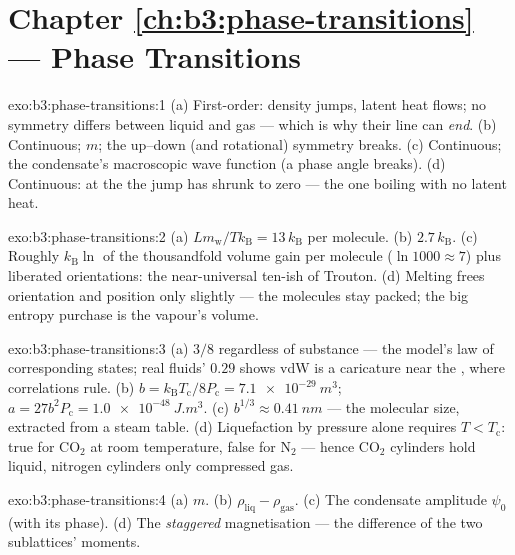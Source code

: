 \section*{Chapter \ref{ch:b3:phase-transitions} --- Phase Transitions}

\begin{solution}{exo:b3:phase-transitions:1}
(a) First-order: density jumps, latent heat flows; no symmetry
differs between liquid and gas --- which is why their line can
\emph{end}. (b) Continuous;  $m$; the up--down (and
rotational) symmetry breaks. (c) Continuous; the condensate's
macroscopic wave function (a phase angle breaks). (d) Continuous:
at the  the jump has shrunk to zero --- the one
boiling with no latent heat.
\end{solution}

\begin{solution}{exo:b3:phase-transitions:2}
(a) $Lm_{\text{w}}/Tk_{\text{B}} = 13\,k_{\text{B}}$ per molecule.
(b) $2.7\,k_{\text{B}}$. (c) Roughly $k_{\text{B}}\ln$ of the
thousandfold volume gain per molecule ($\ln1000 \approx 7$) plus
liberated orientations: the near-universal ten-ish of Trouton. (d)
Melting frees orientation and position only slightly --- the
molecules stay packed; the big entropy purchase is the vapour's
volume.
\end{solution}

\begin{solution}{exo:b3:phase-transitions:3}
(a) $3/8$ regardless of substance --- the model's law of
corresponding states; real fluids' $0.29$ shows vdW is a caricature
near the , where correlations rule. (b) $b =
k_{\text{B}}T_{\text{c}}/8P_{\text{c}} = \qty{7.1e-29}{m^3}$; $a =
27b^2P_{\text{c}} = \qty{1.0e-48}{J.m^3}$. (c) $b^{1/3} \approx
\qty{0.41}{nm}$ --- the molecular size, extracted from a steam
table. (d) Liquefaction by pressure alone requires $T <
T_{\text{c}}$: true for CO$_2$ at room temperature, false for
N$_2$ --- hence CO$_2$ cylinders hold liquid, nitrogen cylinders
only compressed gas.
\end{solution}

\begin{solution}{exo:b3:phase-transitions:4}
(a) $m$. (b) $\rho_{\text{liq}} - \rho_{\text{gas}}$. (c) The
condensate amplitude $\psi_0$ (with its phase). (d) The
\emph{staggered} magnetisation --- the difference of the two
sublattices' moments.
\end{solution}

